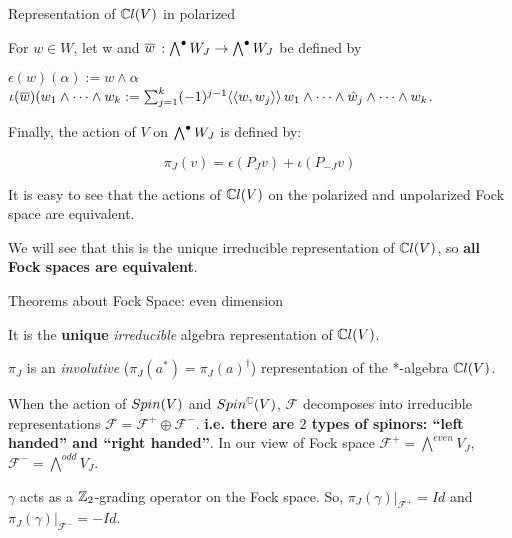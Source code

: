 \begin{frame}{Representation of $\mathbb C l(V)$ in polarized \fjv} %
    
    For $w \in W$, let w and $\overline{w}$ $:\bigwedge^\bullet W_J \to \bigwedge^\bullet W_J$ be defined by
    
    $\epsilon(w)(\alpha) := w \wedge \alpha$\\
    $\iota(\overline{w})(w_1 \wedge \cdots \wedge w_k := \sum_{j = 1}^k (-1)^{j-1} \langle\langle w, w_j \rangle\rangle \, w_1 \wedge \cdots \wedge \hat w_j \wedge \cdots  \wedge w_k$.
    
    Finally, the action of $V$ on $\bigwedge^\bullet W_J$ is defined by:
    
    \[\pi_J(v) = \epsilon(P_J v) + \iota(P_{-J} v)\]
    
    It is easy to see that the actions of $\mathbb C l(V)$ on the polarized and unpolarized Fock space are equivalent.
    
    We will see that this is the unique irreducible representation of $\mathbb C l(V)$, so \textbf{all Fock spaces are equivalent}.
    
\end{frame}

\begin{frame}{Theorems about Fock Space: even dimension} %
    \begin{theorem} It is the \textbf{unique} \emph{irreducible} algebra representation of $\mathbb C l(V)$.\end{theorem}%

    \begin{theorem}$\pi_J$ is an \emph{involutive} ($\pi_J(a^*) = \pi_J(a)^\dagger$) representation of the *-algebra $\mathbb C l(V)$.\end{theorem}%
    
    \begin{theorem}
    When the action of $Spin(V)$ and $Spin^\mathbb C(V)$, $\mathcal F$ decomposes into irreducible representations $\mathcal F = \mathcal F^+ \oplus \mathcal F^-$. \textbf{i.e. there are $2$ types of spinors: ``left handed'' and ``right handed''}. \tiny {In our view of Fock space $\mathcal F^+ = \bigwedge^{even}V_J$, $\mathcal F^- = \bigwedge^{odd}V_J$. }
    \end{theorem}
    
    \begin{proposition} $\gamma$ acts as a $\mathbb Z_2$-grading operator on the Fock space. So,  $\pi_J(\gamma)|_{\mathcal F^+} = Id$ and $\pi_J(\gamma)|_{\mathcal F^-} = -Id$. \end{proposition}%

\end{frame}

